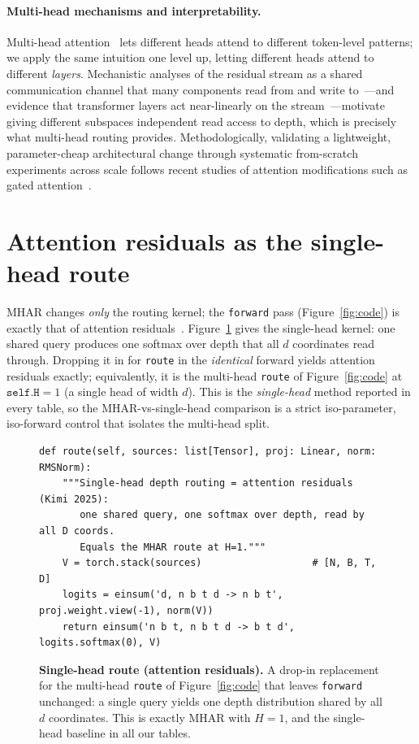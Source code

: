\documentclass{article}
\begin{document}
\paragraph{Multi-head mechanisms and interpretability.} Multi-head
attention~\citep{vaswani2017attention} lets different heads attend to different
token-level patterns; we apply the same intuition one level up, letting different
heads attend to different \emph{layers}. Mechanistic analyses of the residual
stream as a shared communication channel that many components read from and write
to~\citep{elhage2021mathematical}---and evidence that transformer layers act
near-linearly on the stream~\citep{razzhigaev2024linear}---motivate giving different
subspaces independent read access to depth, which is precisely what multi-head
routing provides. Methodologically, validating a
lightweight, parameter-cheap architectural change through systematic from-scratch
experiments across scale follows recent studies of attention modifications such
as gated attention~\citep{qiu2025gated}.

\section{Attention residuals as the single-head route}
\label{app:singlehead}
MHAR changes \emph{only} the routing kernel; the \texttt{forward} pass
(Figure~\ref{fig:code}) is exactly that of attention residuals~\citep{kimi2025attention}.
Figure~\ref{fig:route_single} gives the single-head kernel: one shared query produces one
softmax over depth that all $d$ coordinates read through. Dropping it in for \texttt{route}
in the \emph{identical} forward yields attention residuals exactly; equivalently, it is the
multi-head \texttt{route} of Figure~\ref{fig:code} at $\texttt{self.H}{=}1$ (a single head
of width $d$). This is the \emph{single-head} method reported in every table, so the
MHAR-vs-single-head comparison is a strict iso-parameter, iso-forward control that isolates
the multi-head split.

\begin{figure}[h]
\begin{lstlisting}[style=mhar]
def route(self, sources: list[Tensor], proj: Linear, norm: RMSNorm):
    """Single-head depth routing = attention residuals (Kimi 2025):
       one shared query, one softmax over depth, read by all D coords.
       Equals the MHAR route at H=1."""
    V = torch.stack(sources)                   # [N, B, T, D]
    logits = einsum('d, n b t d -> n b t', proj.weight.view(-1), norm(V))
    return einsum('n b t, n b t d -> b t d', logits.softmax(0), V)
\end{lstlisting}
\caption{\textbf{Single-head route (attention residuals).} A drop-in replacement for the
multi-head \texttt{route} of Figure~\ref{fig:code} that leaves \texttt{forward} unchanged:
a single query yields one depth distribution shared by all $d$ coordinates. This is exactly
MHAR with $H{=}1$, and the single-head baseline in all our tables.}
\label{fig:route_single}
\end{figure}
\end{document}
